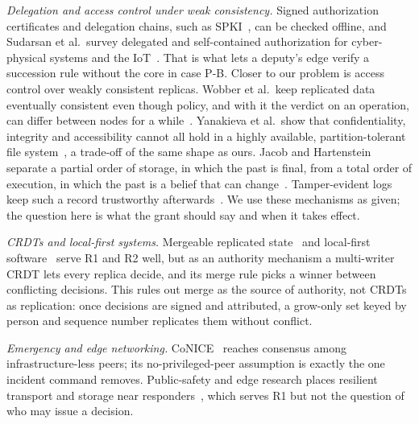 \textit{Delegation and access control under weak consistency.} Signed authorization
certificates and delegation chains, such as SPKI~\cite{rfc2693spki}, can be checked
offline, and Sudarsan et al.\ survey delegated and self-contained authorization for
cyber-physical systems and the IoT~\cite{sudarsan2021survey}. That is what lets a deputy's
edge verify a succession rule without the core in case P-B. Closer to our problem is
access control over weakly consistent replicas. Wobber et al.\ keep replicated data
eventually consistent even though policy, and with it the verdict on an operation, can
differ between nodes for a while~\cite{wobber2010policy}. Yanakieva et al.\ show that
confidentiality, integrity and accessibility cannot all hold in a highly available,
partition-tolerant file system~\cite{yanakieva2021access}, a trade-off of the same shape
as ours. Jacob and Hartenstein separate a partial order of storage, in which the past is
final, from a total order of execution, in which the past is a belief that can
change~\cite{jacob2025eventually}. Tamper-evident logs keep such a record trustworthy
afterwards~\cite{schneier1999audit}. We use these mechanisms as given; the question here
is what the grant should say and when it takes effect. 

\textit{CRDTs and local-first systems.} Mergeable replicated
state~\cite{almeida2014delta,hanssen2025emergency,almeida2024crdtsurvey,mao2024reliablecrdt}
and local-first software~\cite{kleppmann2019localfirst} serve R1 and R2 well, but as an
authority mechanism a multi-writer CRDT lets every replica decide, and its merge rule
picks a winner between conflicting decisions. This rules out merge as the source of
authority, not CRDTs as replication: once decisions are signed and attributed, a
grow-only set keyed by person and sequence number replicates them without conflict.

\textit{Emergency and edge networking.} CoNICE~\cite{jahanian2022conice} reaches
consensus among infrastructure-less peers; its no-privileged-peer assumption is exactly
the one incident command removes. Public-safety and edge research places resilient
transport and storage near
responders~\cite{kumbhar2015legacy,wang2023overview,sagor2024distressnetng}, which serves R1
but not the question of who may issue a decision.

